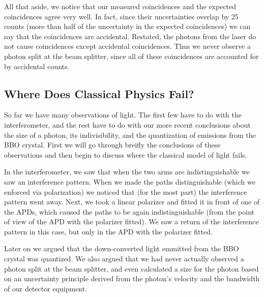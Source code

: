 \documentclass{article}
\begin{document}
\hspace{.25cm}

All that aside, we notice that our measured coincidences and the expected coincidences agree very well.  In fact, since their uncertainties overlap by 25 counts (more than half of the uncertainty in the expected coincidences) we can say that the coincidences are accidental.  Restated, the photons from the laser do not cause coincidences except accidental coincidences.  Thus we never observe a photon split at the beam splitter, since all of these coincidences are accounted for by accidental counts.

\subsection{Where Does Classical Physics Fail?}

So far we have many observations of light.  The first few have to do with the interferometer, and the rest have to do with our more recent conclusions about the size of a photon, its indivisibility, and the quantization of emissions from the BBO crystal.  First we will go through breifly the conclusions of these observations and then begin to discuss where the classical model of light fails.

\hspace{.25cm}

In the interferometer, we saw that when the two arms are indistinguishable we saw an interference pattern.  When we made the paths distinguishable (which we enforced via polarization) we noticed that (for the most part) the interference pattern went away.  Next, we took a linear polarizer and fitted it in front of one of the APDs, which caused the paths to be again indistinguishable (from the point of view of the APD with the polarizer fitted).  We saw a return of the interference pattern in this case, but only in the APD with the polarizer fitted.

\hspace{.25cm}

Later on we argued that the down-converted light emmitted from the BBO crystal was quantized.  We also argued that we had never actually observed a photon split at the beam splitter, and even calculated a size for the photon based on an uncertainty principle derived from the photon's velocity and the bandwidth of our detector equipment.

\hspace{.25cm}
\end{document}
